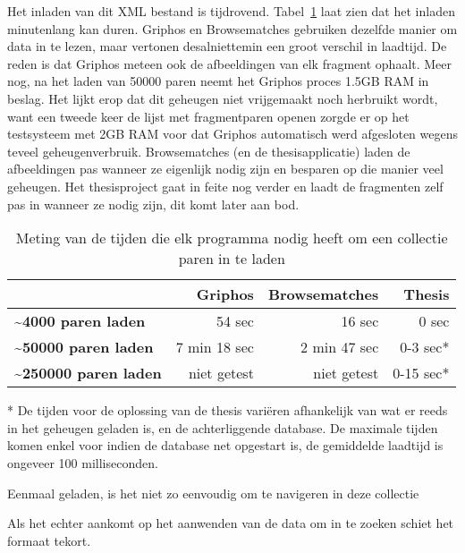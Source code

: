Het inladen van dit XML bestand is tijdrovend. Tabel~\ref{table:matchesloadspeed} laat zien dat het inladen minutenlang kan duren. Griphos en Browsematches gebruiken dezelfde manier om data in te lezen, maar vertonen desalniettemin een groot verschil in laadtijd. De reden is dat Griphos meteen ook de afbeeldingen van elk fragment ophaalt. Meer nog, na het laden van 50000 paren neemt het Griphos proces 1.5GB RAM in beslag. Het lijkt erop dat dit geheugen niet vrijgemaakt noch herbruikt wordt, want een tweede keer de lijst met fragmentparen openen zorgde er op het testsysteem met 2GB RAM voor dat Griphos automatisch werd afgesloten wegens teveel geheugenverbruik. Browsematches (en de thesisapplicatie) laden de afbeeldingen pas wanneer ze eigenlijk nodig zijn en besparen op die manier veel geheugen. Het thesisproject gaat in feite nog verder en laadt de fragmenten zelf pas in wanneer ze nodig zijn, dit komt later aan bod.

\begin{table}[h]
	\begin{center}
		\begin{tabular}{|l|r|r|r|}
		    \rowcolor{gray!75}
		    \hline
		    & \textbf{Griphos} &  \textbf{Browsematches} & \textbf{Thesis} \\
		    \hline
		    \textbf{\textasciitilde 4000 paren laden} & 54 sec & 16 sec & 0 sec \\
		    \textbf{\textasciitilde 50000 paren laden} & 7 min 18 sec & 2 min 47 sec  & 0-3 sec* \\
		    \textbf{\textasciitilde 250000 paren laden} & niet getest & niet getest & 0-15 sec* \\
		    \hline
		\end{tabular}
	\end{center}
	\caption{Meting van de tijden die elk programma nodig heeft om een collectie paren in te laden}
	\label{table:matchesloadspeed}
\end{table}

* De tijden voor de oplossing van de thesis vari\"eren afhankelijk van wat er reeds in het geheugen geladen is, en de achterliggende database. De maximale tijden komen enkel voor indien de database net opgestart is, de gemiddelde laadtijd is ongeveer 100 milliseconden.

Eenmaal geladen, is het niet zo eenvoudig om te navigeren in deze collectie

Als het echter aankomt op het aanwenden van de data om in te zoeken schiet het formaat tekort.

